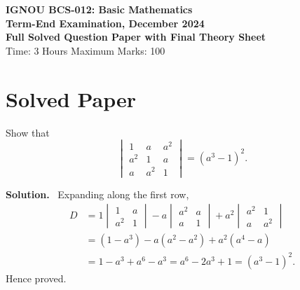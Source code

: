\documentclass[11pt,a4paper]{article}
\newcommand{\question}[2]{\begin{tcolorbox}[breakable,colback=gray!5,colframe=black!35,title=\textbf{Question #1}]#2\end{tcolorbox}}
\newcommand{\answer}{\textbf{Solution.}\ }
\begin{document}
\begin{center}
{\Large\bfseries IGNOU BCS-012: Basic Mathematics}\\[2mm]
{\large\bfseries Term-End Examination, December 2024}\\[1mm]
{\bfseries Full Solved Question Paper with Final Theory Sheet}\\[1mm]
Time: 3 Hours \qquad Maximum Marks: 100
\end{center}

\section*{Solved Paper}

\question{1(a)}{Show that
\[
\begin{vmatrix}
1&a&a^2\\
a^2&1&a\\
a&a^2&1
\end{vmatrix}=(a^3-1)^2 .
\]}
\answer
Expanding along the first row,
\begin{align*}
D&=1\begin{vmatrix}1&a\\ a^2&1\end{vmatrix}
-a\begin{vmatrix}a^2&a\\ a&1\end{vmatrix}
+a^2\begin{vmatrix}a^2&1\\ a&a^2\end{vmatrix}\\
&=(1-a^3)-a(a^2-a^2)+a^2(a^4-a)\\
&=1-a^3+a^6-a^3=a^6-2a^3+1=(a^3-1)^2.
\end{align*}
Hence proved.
\end{document}
